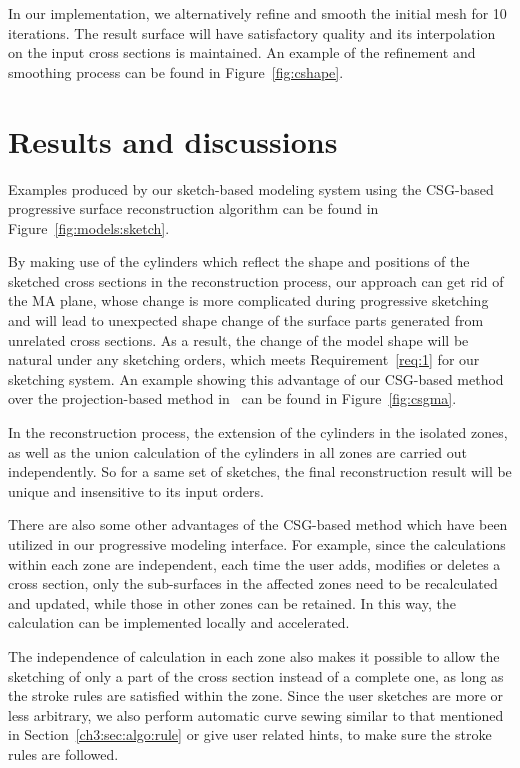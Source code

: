 In our implementation, we alternatively refine and smooth the initial mesh for 10 iterations. The result surface will have satisfactory quality and its interpolation on the input cross sections is maintained. An example of the
refinement and smoothing process can be found in Figure~\ref{fig:cshape}.


\section{Results and discussions}
\label{ch4:sec:disc}

Examples produced by our sketch-based modeling  system using the
CSG-based progressive surface reconstruction algorithm can be found
in Figure~\ref{fig:models:sketch}.

By making use of the cylinders which reflect the shape and
positions of the sketched cross sections in the reconstruction
process, our approach can get rid of the MA plane, whose change is
more complicated during progressive sketching and will lead to
unexpected shape change of the surface parts generated from
unrelated cross sections. As a result, the change of the model shape
will be natural under any sketching orders, which meets
Requirement~\ref{req:1} for our sketching system. An example showing
this advantage of our CSG-based method over the projection-based
method in~\cite{LBDLJ08} can be found in Figure~\ref{fig:csgma}.

In the reconstruction process, the extension of the cylinders in
the isolated zones, as well as the union calculation of the
cylinders in all zones are carried out independently. So for a same
set of sketches, the final reconstruction result will be unique and
insensitive to its input orders.

There are also some other advantages of the  CSG-based method which
have been utilized in our progressive modeling interface. For
example, since the calculations within each zone are independent,
each time the user adds, modifies or deletes a cross section, only
the sub-surfaces in the affected zones need to be recalculated and
updated, while those in other zones can be retained. In this way,
the calculation can be implemented locally and accelerated.

The independence of calculation in each zone also makes it possible
to allow the sketching of only a part of the cross section instead
of a complete one, as long as the stroke rules are satisfied within
the zone. Since the user sketches are more or less arbitrary, we
also perform automatic curve sewing similar to that mentioned in
Section~\ref{ch3:sec:algo:rule} or give user related hints, to make
sure the stroke rules are followed.

